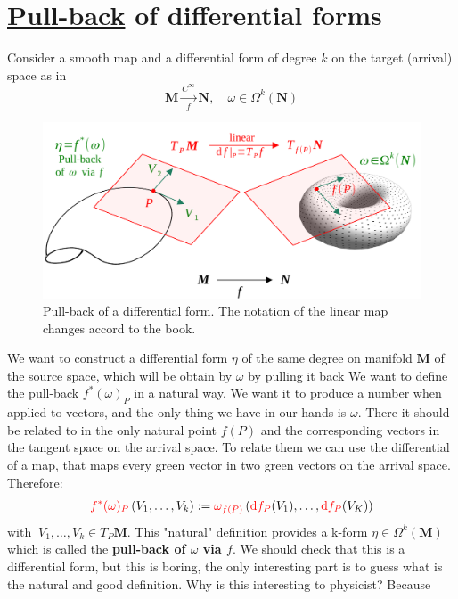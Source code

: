\documentclass[../main.tex]{subfiles}
\begin{document}
\section[Pull-back of differential forms]{\href{https://it.wikipedia.org/wiki/Pull-back}{Pull-back} of differential forms}
Consider a smooth map and a differential form of degree $k$ on the target (arrival) space as in 
\[
\mathbf{M}\xrightarrow[f]{C^\infty}\mathbf{N}, \quad \omega \in \Omega^k(\mathbf{N})
\]
\begin{figure}[H]
	\includegraphics{images/pull_back.pdf}
	\caption{Pull-back of a differential form. The notation of the linear map changes accord to the book.}
\end{figure}
We want to construct a differential form $\eta$ of the same degree on manifold $\mathbf{M}$ of the source space, which will be obtain by $\omega$ by pulling it back We want to define the pull-back $f^\ast(\omega)_P$ in a natural way. We want it to produce a number when applied to vectors, and the only thing we have in our hands is $\omega$. There it should be related to in the only natural point $f(P)$ and the corresponding vectors in the tangent space on the arrival space. To relate them we can use the differential of a map, that maps every green vector in two green vectors on the arrival space. Therefore:
\[
{\color{red} f^\ast(\omega)_P}\left(V_1,\dots,V_k\right):= {\color{red}\omega_{f(P)}}\left({\color{red}\textrm{d}f_P}(V_1),\dots,{\color{red}\textrm{d}f_P}(V_K)\right)
\]
$\textrm{with } \ V_1,\dots,V_k \in T_P\mathbf{M}$. This "natural" definition provides a k-form $\eta\in\Omega^k(\mathbf{M})$ which is called the \textbf{pull-back of $\omega$ via $f$}. We should check that this is a differential form, but this is boring, the only interesting part is to guess what is the natural and good definition. Why is this interesting to physicist? Because\\
\end{document}
